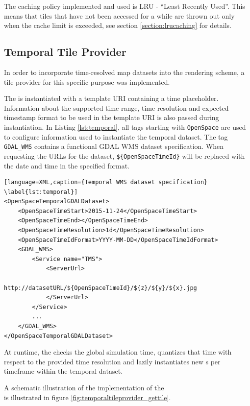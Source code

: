 The caching policy implemented and used is LRU - ``Least Recently Used''. This means that tiles that have not been accessed for a while are thrown out only when the cache limit is exceeded, see section \ref{section:lrucaching} for details.

\subsection{Temporal Tile Provider}
In order to incorporate time-resolved map datasets into the rendering scheme, a tile provider for this specific purpose was implemented.

The  is instantiated with a template URI containing a time placeholder. Information about the supported time range, time resolution and expected timestamp format to be used in the template URI is also passed during instantiation. In Listing \ref{lst:temporal}, all tags starting with \texttt{OpenSpace} are used to configure information used to instantiate the temporal dataset. The tag \texttt{GDAL\_WMS} contains a functional GDAL WMS dataset specification. When requesting the URLs for the dataset, \texttt{\$\{OpenSpaceTimeId\}} will be replaced with the date and time in the specified format.

\begin{lstlisting}[language=XML,caption={Temporal WMS dataset specification} \label{lst:temporal}]
<OpenSpaceTemporalGDALDataset>
    <OpenSpaceTimeStart>2015-11-24</OpenSpaceTimeStart>
    <OpenSpaceTimeEnd></OpenSpaceTimeEnd>
    <OpenSpaceTimeResolution>1d</OpenSpaceTimeResolution>
    <OpenSpaceTimeIdFormat>YYYY-MM-DD</OpenSpaceTimeIdFormat>
    <GDAL_WMS>
        <Service name="TMS">
            <ServerUrl>
                http://datasetURL/${OpenSpaceTimeId}/${z}/${y}/${x}.jpg 
            </ServerUrl>
        </Service>
        ...
    </GDAL_WMS>
</OpenSpaceTemporalGDALDataset>
\end{lstlisting}

At runtime, the  checks the global simulation time, quantizes that time with respect to the provided time resolution and lazily instantiates new s per timeframe within the temporal dataset. 

A schematic illustration of the implementation of the \\  is illustrated in figure \ref{fig:temporaltileprovider_gettile}.

